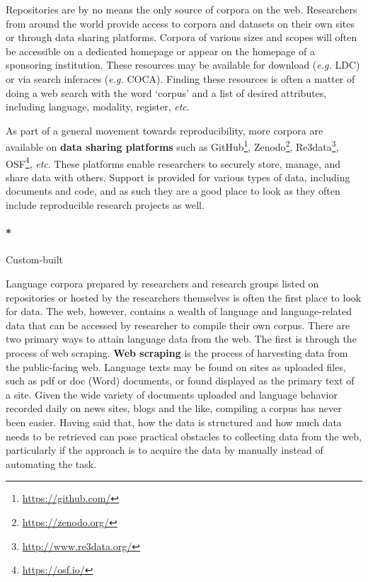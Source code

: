 \documentclass[
  letterpaper,
]{latex/krantz}
\let\oldparagraph\paragraph
\renewcommand{\paragraph}[1]{\oldparagraph{#1}\mbox{}}
\DeclareRobustCommand{\href}[2]{#2\footnote{\url{#1}}}
\begin{document}
Repositories are by no means the only source of corpora on the web.
Researchers from around the world provide access to corpora and datasets
on their own sites or through data sharing platforms. Corpora of various
sizes and scopes will often be accessible on a dedicated homepage or
appear on the homepage of a sponsoring institution. These resources may
be available for download (\emph{e.g.} LDC) or via search inferaces
(\emph{e.g.} COCA). Finding these resources is often a matter of doing a
web search with the word `corpus' and a list of desired attributes,
including language, modality, register, \emph{etc}.

As part of a general movement towards reproducibility, more corpora are
available on \textbf{data sharing platforms} such as
\href{https://github.com/}{GitHub}, \href{https://zenodo.org/}{Zenodo},
\href{http://www.re3data.org/}{Re3data}, \href{https://osf.io/}{OSF},
\emph{etc}. These platforms enable researchers to securely store,
manage, and share data with others. Support is provided for various
types of data, including documents and code, and as such they are a good
place to look as they often include reproducible research projects as
well.

\hypertarget{custom-built}{%
\paragraph*{Custom-built}\label{custom-built}}

Language corpora prepared by researchers and research groups listed on
repositories or hosted by the researchers themselves is often the first
place to look for data. The web, however, contains a wealth of language
and language-related data that can be accessed by researcher to compile
their own corpus. There are two primary ways to attain language data
from the web. The first is through the process of web scraping.
\textbf{Web scraping} is the process of harvesting data from the
public-facing web. Language texts may be found on sites as uploaded
files, such as pdf or doc (Word) documents, or found displayed as the
primary text of a site. Given the wide variety of documents uploaded and
language behavior recorded daily on news sites, blogs and the like,
compiling a corpus has never been easier. Having said that, how the data
is structured and how much data needs to be retrieved can pose practical
obstacles to collecting data from the web, particularly if the approach
is to acquire the data by manually instead of automating the task.
\end{document}
